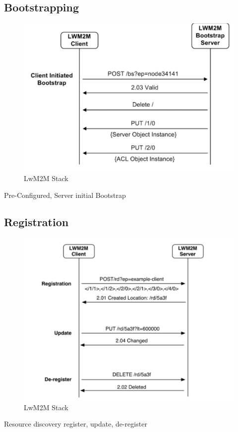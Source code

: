 \subsection{Bootstrapping}
\begin{figure}[H]
\includegraphics[scale=0.5]{images/lwm2m/bootstrap_diagram.png}
\caption{LwM2M Stack\cite{LwM2MInterfaces}}
\end{figure}
Pre-Configured, Server initial Bootstrap

\subsection{Registration}

\begin{figure}[H]
\includegraphics[scale=0.5]{images/lwm2m/registration_diagram.png}
\caption{LwM2M Stack\cite{LwM2MInterfaces}}
\end{figure}
Resource discovery
register, update, de-register


